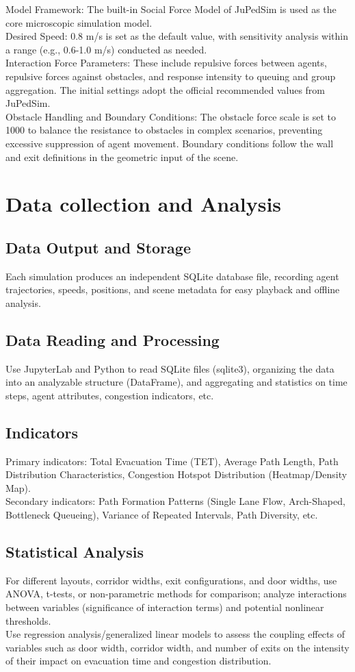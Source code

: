 Model Framework: The built-in Social Force Model of JuPedSim is used as the core microscopic simulation model.
\\Desired Speed: 0.8 m/s is set as the default value, with sensitivity analysis within a range (e.g., 0.6-1.0 m/s) conducted as needed.
\\Interaction Force Parameters: These include repulsive forces between agents, repulsive forces against obstacles, and response intensity to queuing and group aggregation. The initial settings adopt the official recommended values from JuPedSim.
\\Obstacle Handling and Boundary Conditions: The obstacle force scale is set to 1000 to balance the resistance to obstacles in complex scenarios, preventing excessive suppression of agent movement. Boundary conditions follow the wall and exit definitions in the geometric input of the scene.

\section{Data collection and Analysis}

\subsection{Data Output and Storage}
Each simulation produces an independent SQLite database file, recording agent trajectories, speeds, positions, and scene metadata for easy playback and offline analysis.
\subsection{Data Reading and Processing}
Use JupyterLab and Python to read SQLite files (sqlite3), organizing the data into an analyzable structure (DataFrame), and aggregating and statistics on time steps, agent attributes, congestion indicators, etc.
\subsection{Indicators}
Primary indicators: Total Evacuation Time (TET), Average Path Length, Path Distribution Characteristics, Congestion Hotspot Distribution (Heatmap/Density Map).
\\Secondary indicators: Path Formation Patterns (Single Lane Flow, Arch-Shaped, Bottleneck Queueing), Variance of Repeated Intervals, Path Diversity, etc.
\subsection{Statistical Analysis}
For different layouts, corridor widths, exit configurations, and door widths, use ANOVA, t-tests, or non-parametric methods for comparison; analyze interactions between variables (significance of interaction terms) and potential nonlinear thresholds.
\\Use regression analysis/generalized linear models to assess the coupling effects of variables such as door width, corridor width, and number of exits on the intensity of their impact on evacuation time and congestion distribution.
